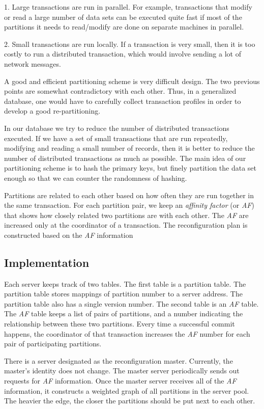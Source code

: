 \documentclass[a4paper, 10pt, notitlepage]{article}
\begin{document}
1. Large transactions are run in parallel. For example, transactions that modify or read a large number of data sets
can be executed quite fast if most of the partitions it needs to read/modify are done on separate machines in parallel.

2. Small transactions are run locally. If a transaction is very small, then it is too costly to run a distributed transaction,
which would involve sending a lot of network messages. 

A good and efficient partitioning scheme is very difficult design. The two previous points are somewhat contradictory with each
other. Thus, in a generalized database, one would have to carefully collect transaction profiles in order to develop a good
re-partitioning.

In our database we try to reduce the number of distributed transactions executed. If we have a set of small transactions that are 
run repeatedly, modifying and reading a small number of records, then it is better to reduce the number of distributed transactions 
as much as possible. The main idea of our partitioning scheme is to hash the primary keys, but finely partition the data set enough 
so that we can counter the randomness of hashing. 

Partitions are related to each other based on how often they are run together in the same transaction. For each partition pair, we
keep an {\em affinity factor} (or {\em AF}) that shows how closely related two partitions are with each other. The {\em AF} are
increased only at the coordinator of a transaction. The reconfiguration plan is constructed based on the {\em AF} information

\subsection{Implementation}

Each server keeps track of two tables. The first table is a partition table. The partition table stores mappings of partition number
to a server address. The partition table also has a single version number. The second table is an {\em AF} table.
The {\em AF} table keeps a list of pairs of partitions, and a number indicating the relationship between these two partitions.
Every time a successful commit happens, the coordinator of that transaction increases the {\em AF} number for each pair of participating
partitions. 

There is a server designated as the reconfiguration master. Currently, the master's identity does not change. The master server
periodically sends out requests for {\em AF} information. Once the master server receives all of the {\em AF} information, it
constructs a weighted graph of all partitions in the server pool. The heavier the edge, the closer the partitions should be 
put next to each other. 
\end{document}

